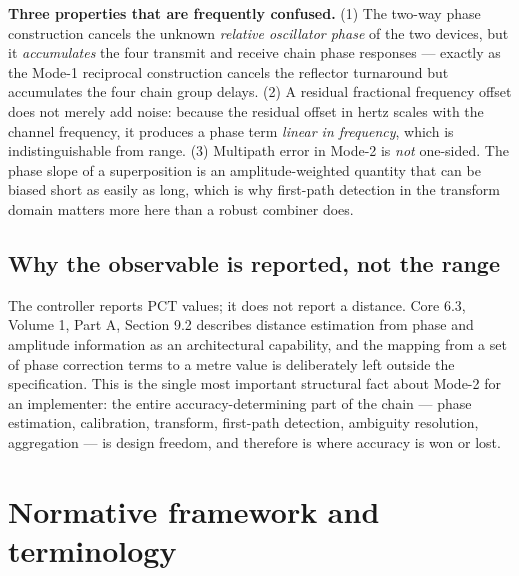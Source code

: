 \documentclass[11pt,a4paper]{article}
\newcommand{\PCT}{\mathrm{PCT}}
\begin{document}
\begin{callout}
\textbf{Three properties that are frequently confused.} (1) The two-way phase construction cancels the
unknown \emph{relative oscillator phase} of the two devices, but it \emph{accumulates} the four
transmit and receive chain phase responses --- exactly as the Mode-1 reciprocal construction cancels
the reflector turnaround but accumulates the four chain group delays. (2) A residual fractional
frequency offset does not merely add noise: because the residual offset in hertz scales with the
channel frequency, it produces a phase term \emph{linear in frequency}, which is indistinguishable
from range. (3) Multipath error in Mode-2 is \emph{not} one-sided. The phase slope of a superposition
is an amplitude-weighted quantity that can be biased short as easily as long, which is why
first-path detection in the transform domain matters more here than a robust combiner does.
\end{callout}

\subsection{Why the observable is reported, not the range}

The controller reports $\PCT$ values; it does not report a distance. Core 6.3, Volume 1, Part A,
Section 9.2 describes distance estimation from phase and amplitude information as an architectural
capability, and the mapping from a set of phase correction terms to a metre value is deliberately
left outside the specification. This is the single most important structural fact about Mode-2 for an
implementer: the entire accuracy-determining part of the chain --- phase estimation, calibration,
transform, first-path detection, ambiguity resolution, aggregation --- is design freedom, and
therefore is where accuracy is won or lost.

\section{Normative framework and terminology}
\end{document}
